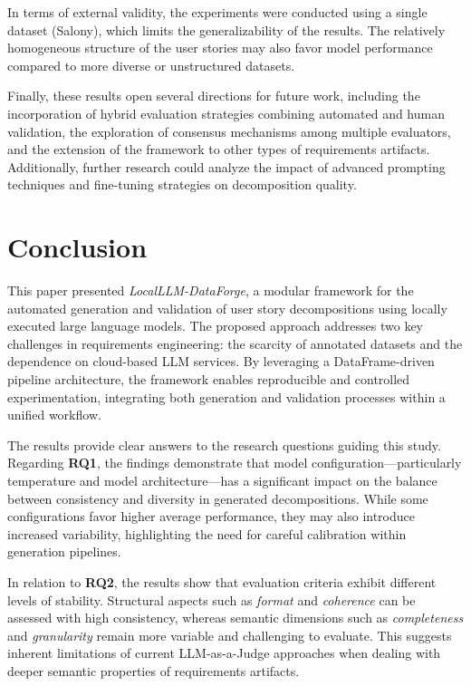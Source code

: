 \documentclass[pdflatex,sn-mathphys-num]{sn-jnl}
\theoremstyle{thmstyleone}%
\theoremstyle{thmstyletwo}%
\theoremstyle{thmstylethree}%
\begin{document}
In terms of external validity, the experiments were conducted using a single dataset (Salony), which limits the generalizability of the results. The relatively homogeneous structure of the user stories may also favor model performance compared to more diverse or unstructured datasets.

Finally, these results open several directions for future work, including the incorporation of hybrid evaluation strategies combining automated and human validation, the exploration of consensus mechanisms among multiple evaluators, and the extension of the framework to other types of requirements artifacts. Additionally, further research could analyze the impact of advanced prompting techniques and fine-tuning strategies on decomposition quality.

\section{Conclusion}\label{sec6}

This paper presented \textit{LocalLLM-DataForge}, a modular framework for the automated generation and validation of user story decompositions using locally executed large language models. The proposed approach addresses two key challenges in requirements engineering: the scarcity of annotated datasets and the dependence on cloud-based LLM services. By leveraging a DataFrame-driven pipeline architecture, the framework enables reproducible and controlled experimentation, integrating both generation and validation processes within a unified workflow.

The results provide clear answers to the research questions guiding this study. Regarding \textbf{RQ1}, the findings demonstrate that model configuration—particularly temperature and model architecture—has a significant impact on the balance between consistency and diversity in generated decompositions. While some configurations favor higher average performance, they may also introduce increased variability, highlighting the need for careful calibration within generation pipelines.

In relation to \textbf{RQ2}, the results show that evaluation criteria exhibit different levels of stability. Structural aspects such as \textit{format} and \textit{coherence} can be assessed with high consistency, whereas semantic dimensions such as \textit{completeness} and \textit{granularity} remain more variable and challenging to evaluate. This suggests inherent limitations of current LLM-as-a-Judge approaches when dealing with deeper semantic properties of requirements artifacts.
\end{document}
